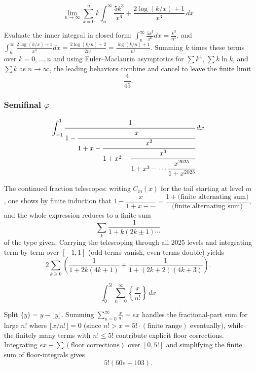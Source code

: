 \begin{questions}
\question
\[
\lim_{n\to\infty}\sum_{k=0}^{n} k\int_n^{\infty} \frac{5k^3}{x^6}+\frac{2\log(k/x)+1}{x^3} \, dx
\]
\begin{solution}
Evaluate the inner integral in closed form: $\int_n^\infty \frac{5k^3}{x^6}dx=\frac{k^3}{n^5}$, and $\int_n^\infty\frac{2\log(k/x)+1}{x^3}dx = \frac{2\log(k/n)+2}{2n^2}=\frac{\log(k/n)+1}{n^2}$. Summing $k$ times these terms over $k=0,\dots,n$ and using Euler–Maclaurin asymptotics for $\sum k^4$, $\sum k\ln k$, and $\sum k$ as $n\to\infty$, the leading behaviors combine and cancel to leave the finite limit
\[
\frac{4}{45}.
\]
\end{solution}

\end{questions}

\subsubsection*{Semifinal $\varphi$}
\begin{questions}

\question
\[
\int_{-1}^{1} \cfrac{1}{1-\cfrac{x}{1+x-\cfrac{x^2}{1+x^2-\cfrac{x^3}{1+x^3-\cdots\cfrac{x^{2025}}{1+x^{2025}}}}}} \, dx
\]
\begin{solution}
The continued fraction telescopes: writing $C_m(x)$ for the tail starting at level $m$, one shows by finite induction that $1-\dfrac{x}{1+x-\cdots}=\dfrac{1+\text{(finite alternating sum)}}{\text{(finite alternating sum)}}$, and the whole expression reduces to a finite sum
\[
\sum_{k}\frac{1}{1+k(2k\pm1)\cdots}
\]
of the type given. Carrying the telescoping through all $2025$ levels and integrating term by term over $[-1,1]$ (odd terms vanish, even terms double) yields
\[
2\sum_{k\ge0}\left(\frac{1}{1+2k(4k+1)}+\frac{1}{1+(2k+2)(4k+3)}\right).
\]
\end{solution}

\question
\[
\int_0^{5!} \sum_{n=0}^{\infty}\left\{\frac{x}{n!}\right\} \, dx
\]
\begin{solution}
Split $\{y\}=y-\lfloor y\rfloor$. Summing $\sum_{n=0}^\infty \frac{x}{n!}=ex$ handles the fractional-part sum for large $n!$ where $\lfloor x/n!\rfloor=0$ (since $n!>x=5!\cdot(\text{finite range})$ eventually), while the finitely many terms with $n!\le 5!$ contribute explicit floor corrections. Integrating $ex-\sum(\text{floor corrections})$ over $[0,5!]$ and simplifying the finite sum of floor-integrals gives
\[
5!(60e-103).
\]
\end{solution}

\end{questions}

